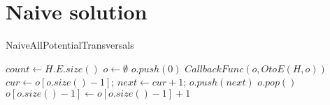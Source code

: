 \chapter{Naive solution}


\begin{algorithm}
	\caption{NaiveAllPotentialTransversals}\label{NaiveAllPotentialTransversals}
	\begin{algorithmic}[1]
		\State $count \gets H.E.size()$
		\State $o \gets \emptyset$
		\State $o.push(0)$
		 {}
		\State $CallbackFunc(o,OtoE(H,o))$
		\EndIf
		\State $cur \gets o[o.size()-1]$;
		\State $next \gets cur + 1$;
		\State $o.push(next)$
		\Else
		\State $o.pop()$
		\State $o[o.size()-1] \gets o[o.size()-1] +1 $
		\EndIf
		\EndIf
		\EndWhile
		\EndFunction
	\end{algorithmic}
\end{algorithm}